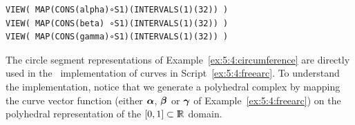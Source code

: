 \begin{coding}[Algebraic computation of FE = $\delta_1$]
{\begin{condition}
\begin{lstlisting}[language=JuliaLocal, style=julia, mathescape=true]
VIEW( MAP(CONS(alpha)∘S1)(INTERVALS(1)(32)) )
VIEW( MAP(CONS(beta) ∘S1)(INTERVALS(1)(32)) )
VIEW( MAP(CONS(gamma)∘S1)(INTERVALS(1)(32)) )
\end{lstlisting}
\end{condition}

The circle segment representations of Example~\ref{ex:5:4:circumference} are directly
used in the \pl\ implementation of curves in
Script~\ref{ex:5:4:freearc}.  To understand the implementation, notice
that we generate a polyhedral complex by mapping the curve vector
function (either ${\mbox{\boldmath $\alpha$}}$, ${\mbox{\boldmath $\beta$}}$ or ${\mbox{\boldmath $\gamma$}}$ of
Example~\ref{ex:5:4:freearc}) on the polyhedral representation of the
$[0,1]\subset\mathbb{I\!\!R}$ domain.




%
%
%



}
\end{coding}
